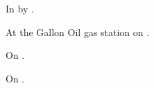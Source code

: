
\begin{LocationList}

In  by .

At the Gallon Oil gas station on .

On .

\Location{\TruckService \Service \Rest}
On .

\end{LocationList}
